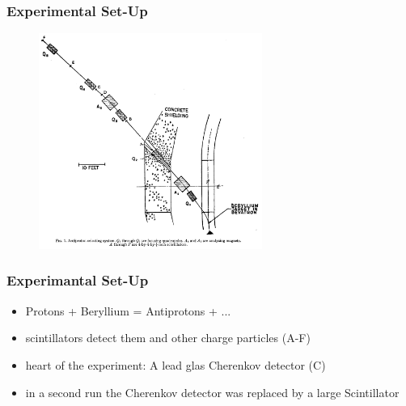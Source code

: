 \documentclass{beamer}
\begin{document}

\begin{frame}
\frametitle{Experimental Set-Up}
\begin{figure}
\includegraphics[width=0.65\textwidth]{experiment}
\end{figure}
\end{frame}


\begin{frame}
\frametitle{Experimantal Set-Up}
\begin{itemize}
  \item Protons + Beryllium = Antiprotons + ...
  \item scintillators detect them and other charge particles (A-F)
  \item heart of the experiment: A lead glas Cherenkov detector (C)
  \item in a second run the Cherenkov detector was replaced by a large Scintillator
\end{itemize}
\end{frame}
\end{document}
